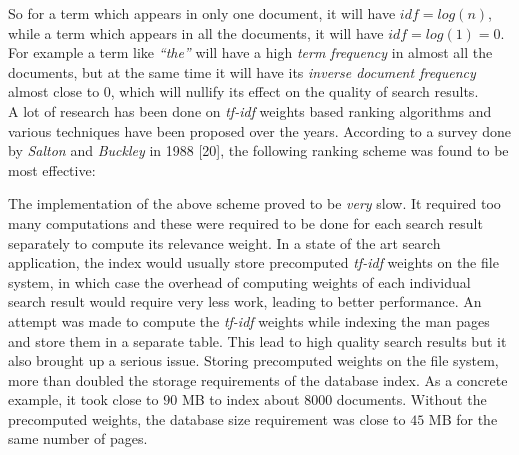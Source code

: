 \documentclass[letterpaper,twocolumn,10pt]{article}
\begin{document}
\begin{description}
So for a term which appears in only one document, it will have
$idf = log(n)$,
while a term which appears in all the documents, it will have
$idf = log(1) = 0$.
For example a term like \textit{``the''} will have a high
\textit{term frequency} in almost all the
documents, but at the same time it will have its \textit{inverse document frequency} almost close to $0$, which will nullify its effect on the quality of search results. \\

A lot of research has been done on \textit{tf-idf} weights based ranking
algorithms and various techniques have been proposed over the years. According
to a survey done by \textit{Salton} and \textit{Buckley} in 1988 [20], the
following ranking scheme was found to be most effective:

\begin{center}
\end{center}

The implementation of the above scheme proved to be \emph{very} slow. It required
too many computations and these were required to be done for each
search result separately to compute its relevance weight. In a state of the
art search application, the index would usually store precomputed \textit{tf-idf}
weights on the file system, in which case the overhead of computing weights of
each individual search result would require very less work, leading to better
performance. An attempt was made to compute the \textit{tf-idf} weights while
indexing the man pages and store them in a separate table. This lead to high
quality search results but it also brought up a serious issue. Storing
precomputed weights on the file system, more than doubled the storage
requirements of the database index. As a concrete example, it took close
to $90$ MB to index about $8000$ documents. Without the precomputed weights, 
the database size requirement was close to $45$ MB for the same number of pages.
\end{description}
\end{document}
